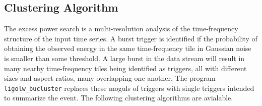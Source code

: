\documentclass[10pt]{article}
\newcommand{\prog}[1]{\texttt{#1}}
\begin{document}
\subsection{Clustering Algorithm}


The excess power search is a multi-resolution analysis of the
time-frequency structure of the input time series.  A burst trigger is
identified if the probability of obtaining the observed energy in the same
time-frequency tile in Gaussian noise is smaller than some threshold.  A
large burst in the data stream will result in many nearby time-frequency
tiles being identified as triggers, all with different sizes and aspect
ratios, many overlapping one another.  The program \prog{ligolw\_bucluster}
replaces these moguls of triggers with single triggers intended to
summarize the event.  The following clustering algorithms are avialable.
\end{document}
